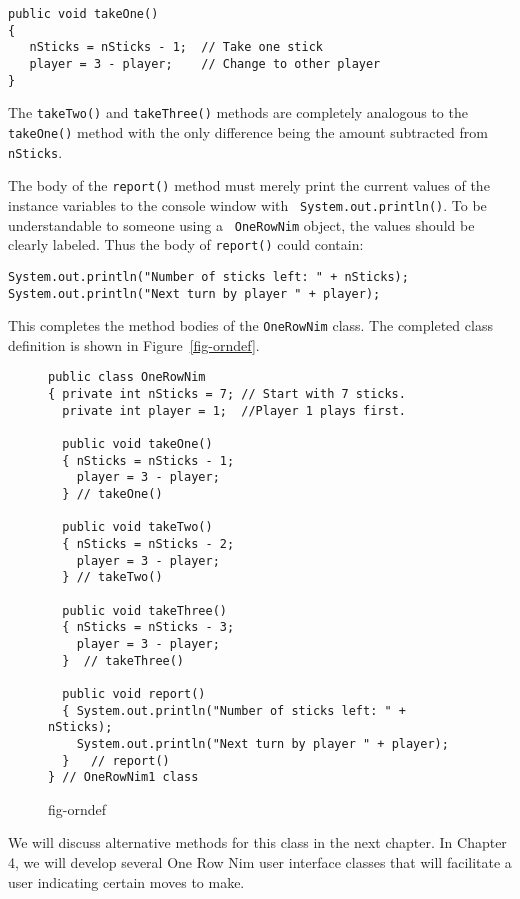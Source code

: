 \begin{jjjlisting}
\begin{lstlisting}
public void takeOne()
{
   nSticks = nSticks - 1;  // Take one stick
   player = 3 - player;    // Change to other player
}
\end{lstlisting}
\end{jjjlisting}

\noindent The {\tt takeTwo()} and {\tt takeThree()} methods are completely
analogous to the {\tt takeOne()} method with the only difference being
the amount subtracted from {\tt nSticks}.

The body of the {\tt report()} method must merely print the current
values of the instance variables to the console window with {\tt
System.out.println()}.  To be understandable to someone using a {\tt
OneRowNim} object, the values should be clearly labeled.  Thus the body
of {\tt report()} could contain:

\begin{jjjlisting}
\begin{lstlisting}
System.out.println("Number of sticks left: " + nSticks);
System.out.println("Next turn by player " + player);
\end{lstlisting}
\end{jjjlisting}

\noindent This completes the method bodies of the {\tt OneRowNim} class.
The completed class definition is shown in Figure~\ref{fig-orndef}.
\begin{figure}[tb]
\jjjprogstart
\begin{jjjlisting}[27pc]
\begin{lstlisting}
public class OneRowNim 
{ private int nSticks = 7; // Start with 7 sticks.
  private int player = 1;  //Player 1 plays first.

  public void takeOne()
  { nSticks = nSticks - 1;
    player = 3 - player;
  } // takeOne()

  public void takeTwo()
  { nSticks = nSticks - 2;
    player = 3 - player;
  } // takeTwo()

  public void takeThree()
  { nSticks = nSticks - 3;
    player = 3 - player;
  }  // takeThree()

  public void report()
  { System.out.println("Number of sticks left: " + nSticks);
    System.out.println("Next turn by player " + player);
  }   // report()
} // OneRowNim1 class
\end{lstlisting}
\end{jjjlisting}
{fig-orndef}
\end{figure}
We will discuss alternative methods for this class in the next chapter.
In Chapter 4, we will develop several One Row Nim user interface classes
that will facilitate a user indicating certain moves to make.


